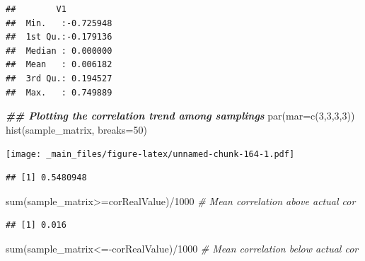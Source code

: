 \documentclass[
  notitlepage,
  onecolumn,
  openany]{book}
\newenvironment{Shaded}{\begin{snugshade}}{\end{snugshade}}
\newcommand{\AttributeTok}[1]{\textcolor[rgb]{0.77,0.63,0.00}{#1}}
\newcommand{\CommentTok}[1]{\textcolor[rgb]{0.56,0.35,0.01}{\textit{#1}}}
\newcommand{\DecValTok}[1]{\textcolor[rgb]{0.00,0.00,0.81}{#1}}
\newcommand{\DocumentationTok}[1]{\textcolor[rgb]{0.56,0.35,0.01}{\textbf{\textit{#1}}}}
\newcommand{\FunctionTok}[1]{\textcolor[rgb]{0.00,0.00,0.00}{#1}}
\newcommand{\NormalTok}[1]{#1}
\newcommand{\OtherTok}[1]{\textcolor[rgb]{0.56,0.35,0.01}{#1}}
\newcommand{\SpecialCharTok}[1]{\textcolor[rgb]{0.00,0.00,0.00}{#1}}
\begin{document}
\begin{verbatim}
##        V1           
##  Min.   :-0.725948  
##  1st Qu.:-0.179136  
##  Median : 0.000000  
##  Mean   : 0.006182  
##  3rd Qu.: 0.194527  
##  Max.   : 0.749889
\end{verbatim}

\begin{Shaded}
\begin{Highlighting}[]
\DocumentationTok{\#\# Plotting the correlation trend among samplings}
\FunctionTok{par}\NormalTok{(}\AttributeTok{mar=}\FunctionTok{c}\NormalTok{(}\DecValTok{3}\NormalTok{,}\DecValTok{3}\NormalTok{,}\DecValTok{3}\NormalTok{,}\DecValTok{3}\NormalTok{))}
\FunctionTok{hist}\NormalTok{(sample\_matrix, }\AttributeTok{breaks=}\DecValTok{50}\NormalTok{)}
\end{Highlighting}
\end{Shaded}

\texttt{[image: \_main\_files/figure-latex/unnamed-chunk-164-1.pdf]}

\begin{Shaded}
\end{Shaded}

\begin{verbatim}
## [1] 0.5480948
\end{verbatim}

\begin{Shaded}
\begin{Highlighting}[]
\FunctionTok{sum}\NormalTok{(sample\_matrix}\SpecialCharTok{\textgreater{}=}\NormalTok{corRealValue)}\SpecialCharTok{/}\DecValTok{1000} \CommentTok{\# Mean correlation above actual cor}
\end{Highlighting}
\end{Shaded}

\begin{verbatim}
## [1] 0.016
\end{verbatim}

\begin{Shaded}
\begin{Highlighting}[]
\FunctionTok{sum}\NormalTok{(sample\_matrix}\SpecialCharTok{\textless{}={-}}\NormalTok{corRealValue)}\SpecialCharTok{/}\DecValTok{1000} \CommentTok{\# Mean correlation below actual cor}
\end{Highlighting}
\end{Shaded}
\end{document}
